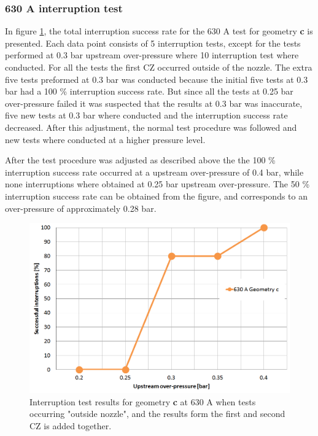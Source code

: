 \documentclass[10pt,b5paper,twoside]{article}
\begin{document}
\subsubsection*{630 A interruption test}
In figure \ref{fig:results630AgeoC}, the total interruption success rate for the 630 A test for geometry \textbf{c} is presented. Each data point consists of 5 interruption tests, except for the tests performed at 0.3 bar upstream over-pressure where 10 interruption test where conducted. For all the tests the first CZ occurred outside of the nozzle. The extra five tests preformed at 0.3 bar was conducted because the initial five tests at 0.3 bar had a 100 \% interruption success rate. But since all the tests at 0.25 bar over-pressure failed it was suspected that the results at 0.3 bar was inaccurate, five new tests at 0.3 bar where conducted and the interruption success rate decreased. After this adjustment, the normal test procedure was followed and new tests where conducted at a higher pressure level.

After the test procedure was adjusted as described above the the 100 \% interruption success rate occurred at a upstream over-pressure of 0.4 bar, while none interruptions where obtained at 0.25 bar upstream over-pressure. The 50 \% interruption success rate can be obtained from the figure, and corresponds to an over-pressure of approximately 0.28 bar.

\begin{figure}[H]
\centering
\includegraphics[scale=0.45]{Bilder/Results/geoC630amp.PNG}
\caption{Interruption test results for geometry \textbf{c} at 630 A when tests occurring "outside nozzle", and the results form the first and second CZ is added together.} \label{fig:results630AgeoC}
\end{figure}
\end{document}
